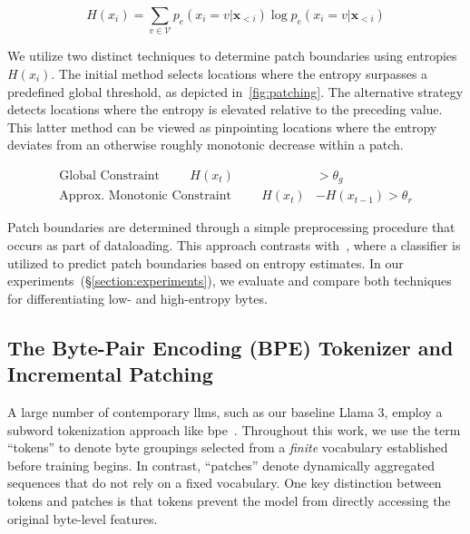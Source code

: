 \begin{equation}
H(x_i) = \sum_{v \in \mathcal{V}} p_{e}(x_i=v|\pmb{x}_{<i}) \log p_{e}(x_i=v|\pmb{x}_{<i})
\end{equation}

We utilize two distinct techniques to determine patch boundaries using entropies $H(x_i)$. The initial method selects locations where the entropy surpasses a predefined global threshold, as depicted in~\autoref{fig:patching}. The alternative strategy detects locations where the entropy is elevated relative to the preceding value. This latter method can be viewed as pinpointing locations where the entropy deviates from an otherwise roughly monotonic decrease within a patch.

\begin{align*}
    \text{Global Constraint}\hspace{1cm}H(x_t)& > \theta_g\\
    \text{Approx. Monotonic Constraint}\hspace{1cm}H(x_t)& - H(x_{t-1}) > \theta_r
\end{align*}

Patch boundaries are determined through a simple preprocessing procedure that occurs as part of dataloading. This approach contrasts with~\citet{nawrot-etal-2023-efficient}, where a classifier is utilized to predict patch boundaries based on entropy estimates. In our experiments~(\S\ref{section:experiments}), we evaluate and compare both techniques for differentiating low- and high-entropy bytes.

\subsection{The Byte-Pair Encoding (BPE) Tokenizer and Incremental Patching}
\label{section:incremental-patching}
\label{section:bpe-patch}

A large number of contemporary llms, such as our baseline Llama 3, employ a subword tokenization approach like bpe~\citep{gage1994new, sennrich-etal-2016-neural}. Throughout this work, we use the term ``tokens'' to denote byte groupings selected from a \textit{finite} vocabulary established before training begins. In contrast, ``patches'' denote dynamically aggregated sequences that do not rely on a fixed vocabulary. One key distinction between tokens and patches is that tokens prevent the model from directly accessing the original byte-level features.

